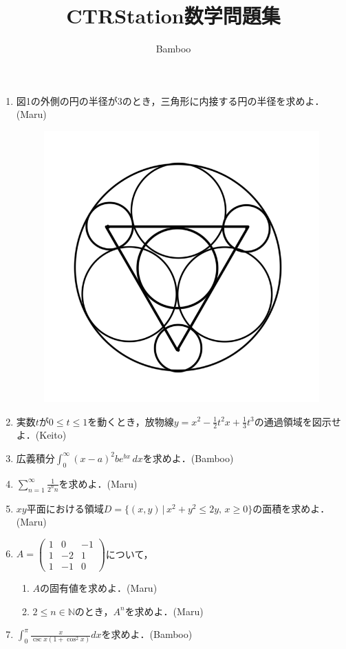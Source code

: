 \documentclass{ltjsarticle}
\title{CTRStation数学問題集}
\author{Bamboo}
\begin{document}
\maketitle

\begin{enumerate}
  \setlength{\parskip}{4cm}
  \everymath{\displaystyle}

  \item 図1の外側の円の半径が3のとき，三角形に内接する円の半径を求めよ．(Maru)

  \begin{figure}[htbp]
  \centering
  \includegraphics[scale=0.3]{radius.png}
  \caption{}
  \end{figure}

  \item 実数$t$が$0\le t\le1$を動くとき，放物線$y=x^2-\frac{1}{2}t^2x+\frac{1}{3}t^3$の通過領域を図示せよ．(Keito)
  \item 広義積分$\int_{0}^{∞}(x-a)^2be^{bx}\,dx$を求めよ．(Bamboo)
  \item $\sum_{n=1}^\infty \frac{1}{2^nn}$を求めよ．(Maru)
  \item $xy$平面における領域$D=\{(x,y)\,|\,x^2+y^2\le2y,\,x\ge0\}$の面積を求めよ．(Maru)

  \item $A=\begin{pmatrix}
    1 & 0 & -1 \\
    1 & -2 & 1 \\
    1 & -1 & 0
  \end{pmatrix}$について，
  \setlength{\parskip}{1.8cm}
  \begin{enumerate}
    \setlength{\parskip}{4cm}
    \item $A$の固有値を求めよ．(Maru)
    \item $2\le n\in \mathbb{N}$のとき，$A^n$を求めよ．(Maru)
  \end{enumerate}

  \setlength{\parskip}{4cm}

  \item $\int_{0}^{\pi}\frac{x}{\csc x(1+\cos ^2 x)}dx$を求めよ．(Bamboo)

\end{enumerate}
\end{document}

